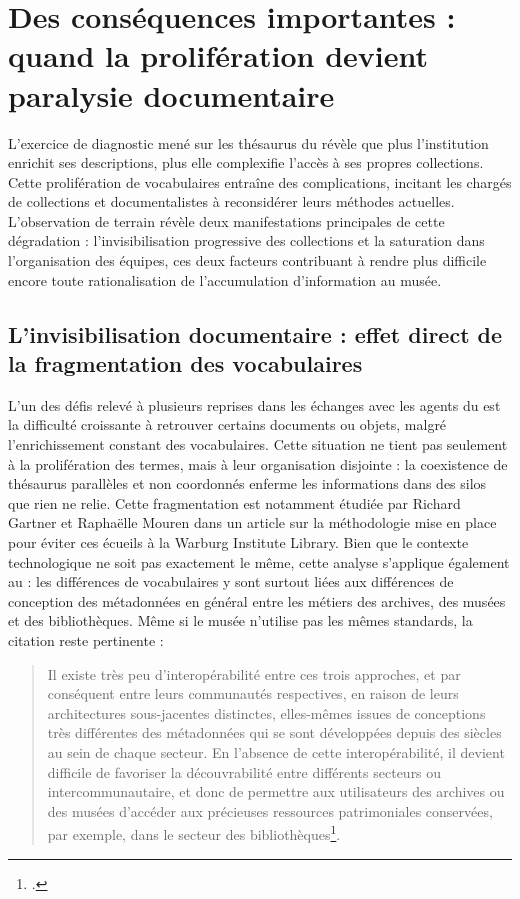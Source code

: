 \section{\label{II-A-2}Des conséquences importantes : quand la prolifération devient paralysie documentaire}

L’exercice de diagnostic mené sur les thésaurus du \mae révèle que plus l’institution enrichit ses descriptions, plus elle complexifie l’accès à ses propres collections. Cette prolifération de vocabulaires entraîne des complications, incitant les chargés de collections et documentalistes à reconsidérer leurs méthodes actuelles. L’observation de terrain révèle deux manifestations principales de cette dégradation : l’invisibilisation progressive des collections et la saturation dans l’organisation des équipes, ces deux facteurs contribuant à rendre plus difficile encore toute rationalisation de l’accumulation d’information au musée.

\subsection{L’invisibilisation documentaire : effet direct de la fragmentation des vocabulaires}

L’un des défis relevé à plusieurs reprises dans les échanges avec les agents du \mae est la difficulté croissante à retrouver certains documents ou objets, malgré l’enrichissement constant des vocabulaires. Cette situation ne tient pas seulement à la prolifération des termes, mais à leur organisation disjointe : la coexistence de thésaurus parallèles et non coordonnés enferme les informations dans des silos que rien ne relie. Cette fragmentation est notamment étudiée par Richard Gartner et Raphaëlle Mouren dans un article sur la méthodologie mise en place pour éviter ces écueils à la Warburg Institute Library. Bien que le contexte technologique ne soit pas exactement le même, cette analyse s’applique également au \mae : les différences de vocabulaires y sont surtout liées aux différences de conception des métadonnées en général entre les métiers des archives, des musées et des bibliothèques. Même si le musée n’utilise pas les mêmes standards, la citation reste pertinente :  

\begin{quote}
	\og Il existe très peu d’interopérabilité entre ces trois approches, et par conséquent entre leurs communautés respectives, en raison de leurs architectures sous-jacentes distinctes, elles-mêmes issues de conceptions très différentes des métadonnées qui se sont développées depuis des siècles au sein de chaque secteur. En l’absence de cette interopérabilité, il devient difficile de favoriser la découvrabilité entre différents secteurs ou intercommunautaire, et donc de permettre aux utilisateurs des archives ou des musées d’accéder aux précieuses ressources patrimoniales conservées, par exemple, dans le secteur des bibliothèques\footcite{gartnerArchivesMuseumsLibraries2019}.\fg
\end{quote}

